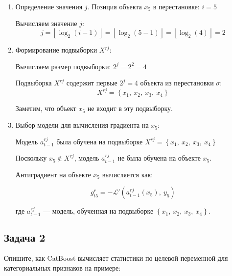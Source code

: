 \begin{enumerate}
\item  Определение значения $j$. Позиция объекта $x_5$ в перестановке: $i = 5$
   
   Вычисляем значение $j$:
   $$
   j = \left\lfloor \log_2(i - 1) \right\rfloor = \left\lfloor \log_2(5 - 1) \right\rfloor = \left\lfloor \log_2(4) \right\rfloor = 2
   $$
\item  Формирование подвыборки $X^{rj}$:

   Вычисляем размер подвыборки: $2^j = 2^2 = 4$

   Подвыборка $X^{rj}$ содержит первые $2^j = 4$ объекта из перестановки $\sigma$:
   $$
   X^{rj} = \left\{ x_1, \ x_2, \ x_3, \ x_4 \right\}
   $$

   Заметим, что объект $x_5$ не входит в эту подвыборку.
   
\item  Выбор модели для вычисления градиента на $x_5$:

   Модель $a_{t-1}^{rj}$ была обучена на подвыборке $X^{rj} = \left\{ x_1, \ x_2, \ x_3, \ x_4 \right\}$

   Поскольку $x_5 \notin X^{rj}$, модель $a_{t-1}^{rj}$ не была обучена на объекте $x_5$.

   Антиградиент на объекте $x_5$ вычисляется как:

   $$
   g_{t5}^r = -\mathcal{L}'\left( a_{t-1}^{rj}(x_5), \ y_5 \right)
   $$

   где \( a_{t-1}^{rj} \) — модель, обученная на подвыборке \( \left\{ x_1, \ x_2, \ x_3, \ x_4 \right\} \).

\end{enumerate}

\subsection*{Задача 2}

Опишите, как CatBoost вычисляет статистики по целевой переменной для категориальных признаков на примере:

